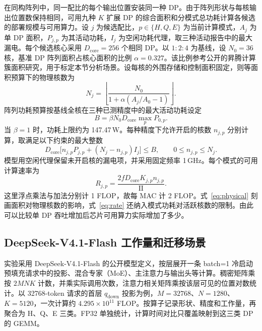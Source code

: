 \documentclass[10.5pt,compsoc,UTF8]{CjC}
\newcommand{\ratio}[3]{\ensuremath{#1\!:\!#2\!:\!#3}}
\begin{document}
在同构阵列中，同一配比的每个输出位置安装同一种 DP。由于阵列形状与每核输出位置数保持相同，可用九种 $K$ 扩展 DP 的综合面积和分模式总功耗计算各候选的部署规模与可用算力。设 $j$ 为候选配比，$p\in\{H,Q,E\}$ 为当前计算模式，$A_j$ 为单 DP 面积，$P_{j,p}$ 为其活动功耗，$I_j$ 为空闲功耗代理，取三种活动报告中的最大漏电。每个候选核心采用 $D_{\mathrm{core}}=256$ 个相同 DP。以 \ratio{1}{2}{4} 为基线，设 $N_0=36$ 核，基准 DP 阵列面积占核心面积的比例 $\alpha=0.327$。该比例参考公开的昇腾计算簇面积研究\cite{luo2024hifloat8area}，用于标定本节分析场景。设每核的外围存储和控制面积固定，则等面积预算下的物理核数为
\begin{equation}
  N_j=\left\lfloor\frac{N_0}{1+\alpha(A_j/A_0-1)}\right\rfloor.
  \label{eq:physical}
\end{equation}
阵列功耗预算按基线全核在三种已测精度中的最大活动功耗设定
\begin{equation}
  B=\beta N_0 D_{\mathrm{core}}\max_p P_{0,p}.
  \label{eq:powerbudget}
\end{equation}
当 $\beta=1$ 时，功耗上限约为 147.47\,W。每种精度下允许开启的核数 $n_{j,p}$ 分别计算，取满足以下约束的最大整数
\begin{equation}
  D_{\mathrm{core}}\bigl[n_{j,p}P_{j,p}+(N_j-n_{j,p})I_j\bigr]\le B,
  \qquad 0\le n_{j,p}\le N_j .
\end{equation}
模型用空闲代理保留未开启核的漏电项，并采用固定频率 1\,GHz。每个模式的可用计算速率为
\begin{equation}
  R_{j,p}=\frac{2f D_{\mathrm{core}} K_{j,p} n_{j,p}}{\mathrm{II}} .
  \label{eq:rate}
\end{equation}
这里浮点乘法与加法分别计 1 FLOP，故每 MAC 计 2 FLOP。式~\eqref{eq:physical} 刻画面积对物理核数的影响，式~\eqref{eq:rate} 还纳入模式功耗对活跃核数的限制。由此可以比较单 DP 吞吐增加后芯片可用算力实际增加了多少。

\subsection{DeepSeek-V4.1-Flash 工作量和迁移场景}

实验采用 DeepSeek-V4.1-Flash 的公开模型定义\cite{deepseekv41source}，按层展开一条 batch=1 冷启动预填充请求中的投影、混合专家（MoE）、主注意力与输出头等计算。稠密矩阵乘按 $2MNK$ 计数，并乘实际调用次数，注意力相关矩阵乘按该层可见的位置对数统计。以 32768-token 请求的首层 $q_{\mathrm{down}}$ 投影为例，$M=32768$、$N=1280$、$K=5120$，一次计算约 $4.295\times10^{11}$ FLOP。按算子记录形状、精度和工作量，再聚合为 H、Q、E 三类。FP32 单独统计，计算时间对比只覆盖映射到这三类 DP 的 GEMM。
\end{document}
